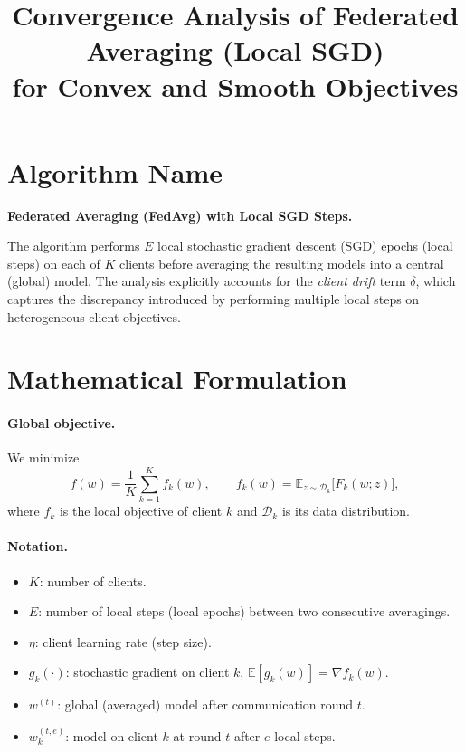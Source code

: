 \documentclass[11pt]{article}
\title{Convergence Analysis of Federated Averaging (Local SGD) \\ for Convex and Smooth Objectives}
\author{}
\date{}
\begin{document}
\maketitle

\section*{Algorithm Name}
\textbf{Federated Averaging (FedAvg) with Local SGD Steps.}

The algorithm performs $E$ local stochastic gradient descent (SGD) epochs (local steps)
on each of $K$ clients before averaging the resulting models into a central (global) model.
The analysis explicitly accounts for the \emph{client drift} term $\delta$, which captures
the discrepancy introduced by performing multiple local steps on heterogeneous client objectives.

\section*{Mathematical Formulation}

\paragraph{Global objective.}
We minimize
\[
f(w) = \frac{1}{K}\sum_{k=1}^{K} f_k(w),
\qquad
f_k(w) = \mathbb{E}_{z \sim \mathcal{D}_k}\big[ F_k(w;z) \big],
\]
where $f_k$ is the local objective of client $k$ and $\mathcal{D}_k$ is its data distribution.

\paragraph{Notation.}
\begin{itemize}
  \item $K$: number of clients.
  \item $E$: number of local steps (local epochs) between two consecutive averagings.
  \item $\eta$: client learning rate (step size).
  \item $g_k(\cdot)$: stochastic gradient on client $k$, $\mathbb{E}[g_k(w)] = \nabla f_k(w)$.
  \item $w^{(t)}$: global (averaged) model after communication round $t$.
  \item $w_k^{(t,e)}$: model on client $k$ at round $t$ after $e$ local steps.
\end{itemize}
\end{document}

